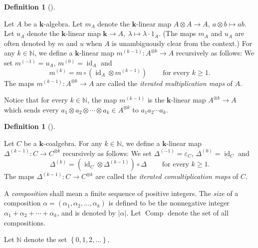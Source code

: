 \documentclass
[numbers=enddot,12pt,final,onecolumn,notitlepage,abstracton]{scrartcl}%
\theoremstyle{definition}
\newtheorem{defi}[theo]{Definition}
\newenvironment{definition}[1][]
{\begin{defi}[#1]\begin{leftbar}}
{\end{leftbar}\end{defi}}
\begin{document}
\begin{definition}
\label{def.iterated-mult}Let $A$ be a $\mathbf{k}$-algebra. Let $m_{A}$ denote
the $\mathbf{k}$-linear map $A\otimes A\rightarrow A,\ a\otimes b\mapsto ab$.
Let $u_{A}$ denote the $\mathbf{k}$-linear map $\mathbf{k}\rightarrow
A,\ \lambda\mapsto\lambda\cdot1_{A}$. (The maps $m_{A}$ and $u_{A}$ are often
denoted by $m$ and $u$ when $A$ is unambiguously clear from the context.) For
any $k\in\mathbb{N}$, we define a $\mathbf{k}$-linear map $m^{\left(
k-1\right)  }:A^{\otimes k}\rightarrow A$ recursively as follows: We set
$m^{\left(  -1\right)  }=u_{A}$, $m^{\left(  0\right)  }=\operatorname*{id}%
\nolimits_{A}$ and%
\[
m^{\left(  k\right)  }=m\circ\left(  \operatorname*{id}\nolimits_{A}\otimes
m^{\left(  k-1\right)  }\right)  \ \ \ \ \ \ \ \ \ \ \text{for every }k\geq1.
\]
The maps $m^{\left(  k-1\right)  }:A^{\otimes k}\rightarrow A$ are called the
\textit{iterated multiplication maps} of $A$.

Notice that for every $k\in\mathbb{N}$, the map $m^{\left(
k-1\right)  }$ is the $\mathbf{k}$-linear map $A^{\otimes k}\rightarrow A$
which sends every $a_{1}\otimes a_{2}\otimes\cdots\otimes a_{k}\in A^{\otimes
k}$ to $a_{1}a_{2}\cdots a_{k}$.
\end{definition}

\begin{definition}
\label{def.iterated-comult}Let $C$ be a $\mathbf{k}$-coalgebra. For any
$k\in\mathbb{N}$, we define a $\mathbf{k}$-linear map $\Delta^{\left(
k-1\right)  }:C\rightarrow C^{\otimes k}$ recursively as follows: We set
$\Delta^{\left(  -1\right)  }=\varepsilon_{C}$, $\Delta^{\left(  0\right)
}=\operatorname*{id}\nolimits_{C}$ and%
\[
\Delta^{\left(  k\right)  }=\left(  \operatorname*{id}\nolimits_{C}%
\otimes\Delta^{\left(  k-1\right)  }\right)  \circ\Delta
\ \ \ \ \ \ \ \ \ \ \text{for every }k\geq1.
\]
The maps $\Delta^{\left(  k-1\right)  }:C\rightarrow C^{\otimes k}$ are called
the \textit{iterated comultiplication maps} of $C$.
\end{definition}

A \textit{composition} shall mean a finite sequence of positive integers. The
\textit{size} of a composition $\alpha=\left(  \alpha_{1},\alpha_{2}%
,\ldots,\alpha_{k}\right)  $ is defined to be the nonnegative integer
$\alpha_{1}+\alpha_{2}+\cdots+\alpha_{k}$, and is denoted by $\left\vert
\alpha\right\vert $. Let $\operatorname*{Comp}$ denote the set of all compositions.

Let $\mathbb{N}$ denote the set $\left\{  0,1,2,\ldots\right\}  $.
\end{document}
